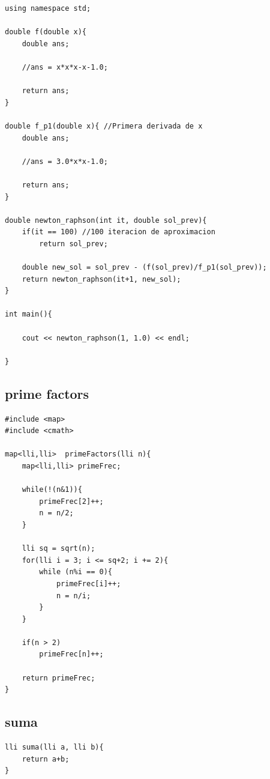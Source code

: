 \documentclass[twoside]{article}
\begin{document}
\begin{multicols*}{2}
\begin{verbatim}
using namespace std;

double f(double x){
	double ans;

	//ans = x*x*x-x-1.0;

	return ans;
}

double f_p1(double x){ //Primera derivada de x
	double ans;

	//ans = 3.0*x*x-1.0;

	return ans;
}

double newton_raphson(int it, double sol_prev){
	if(it == 100) //100 iteracion de aproximacion
		return sol_prev;

	double new_sol = sol_prev - (f(sol_prev)/f_p1(sol_prev));
	return newton_raphson(it+1, new_sol);
}

int main(){

	cout << newton_raphson(1, 1.0) << endl;

}

\end{verbatim}

\subsectionfont{\large\bfseries\sffamily\underline}
\subsection*{prime factors}
\begin{verbatim}
#include <map>
#include <cmath>

map<lli,lli>  primeFactors(lli n){
    map<lli,lli> primeFrec;
    
    while(!(n&1)){ 
    	primeFrec[2]++;
        n = n/2; 
    } 

    lli sq = sqrt(n);
    for(lli i = 3; i <= sq+2; i += 2){ 
        while (n%i == 0){
        	primeFrec[i]++; 
            n = n/i; 
        } 
    } 

    if(n > 2)
    	primeFrec[n]++; 
    
    return primeFrec;
}

\end{verbatim}

\subsectionfont{\large\bfseries\sffamily\underline}
\subsection*{suma}
\begin{verbatim}
lli suma(lli a, lli b){
	return a+b;
}

\end{verbatim}


\end{multicols*}
\end{document}
